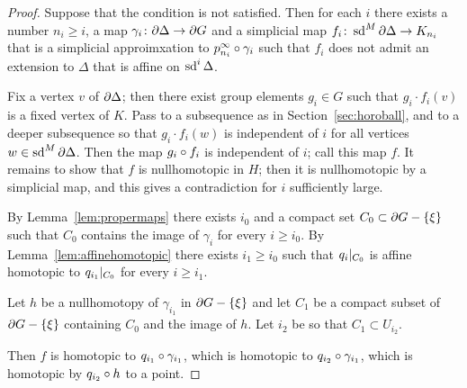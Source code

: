\documentclass[a4paper]{article}
\begin{document}
\begin{proof}
  Suppose that the condition is not satisfied. Then for each $i$ there exists a
  number $n_i \geq i$, a map $\gamma_i \colon \partial\Delta \to \partial G$
  and a simplicial map $f_i \colon \operatorname{sd}^M \partial\Delta \to K_{n_i}$ that is a
  simplicial approimxation to $p^\infty_{n_i}\circ\gamma_i$ such that $f_i$
  does not admit an extension to $\Delta$ that is affine on $\operatorname{sd}^i\Delta$.

  Fix a vertex $v$ of $\partial\Delta$; then there exist group elements $g_i
  \in G$ such that $g_i\cdot f_i(v)$ is a fixed vertex of $K$. Pass to a
  subsequence as in Section~\ref{sec:horoball}, and to a deeper subsequence so
  that $g_i\cdot f_i(w)$ is independent of $i$ for all vertices $w \in \operatorname{sd}^M
  \partial\Delta$. Then the map $g_i\circ f_i$ is independent of $i$; call
  this map $f$. It remains to show that $f$ is nullhomotopic in $H$; then it is
  nullhomotopic by a simplicial map, and this gives a contradiction for $i$
  sufficiently large.

  By Lemma~\ref{lem:propermaps} there exists $i_0$ and a 
  compact set $C_0 \subset \partial G - \left\{\xi\right\}$ such that $C_0$ contains the
  image of $\gamma_i$ for every $i \geq i_0$. By
  Lemma~\ref{lem:affinehomotopic} there exists $i_1 \geq i_0$ such that
  $q_i\vert_{C_0}$ is affine homotopic to $q_{i_1}\vert_{C_0}$ for
  every $i \geq i_1$.  
  
  Let $h$ be a nullhomotopy of $\gamma_{i_1}$ in
  $\partial G - \left\{\xi\right\}$ and let $C_1$ be a compact subset of $\partial G -
  \left\{\xi\right\}$ containing $C_0$ and the image of $h$. Let $i_2$ be so that $C_1
  \subset U_{i_2}$.

  Then $f$ is homotopic to $q_{i_1}\circ\gamma_{i_1}$, which is homotopic
  to $q_{i_2}\circ\gamma_{i_1}$, which is homotopic by $q_{i_2}\circ h$
  to a point.
\end{proof}


\end{document}
